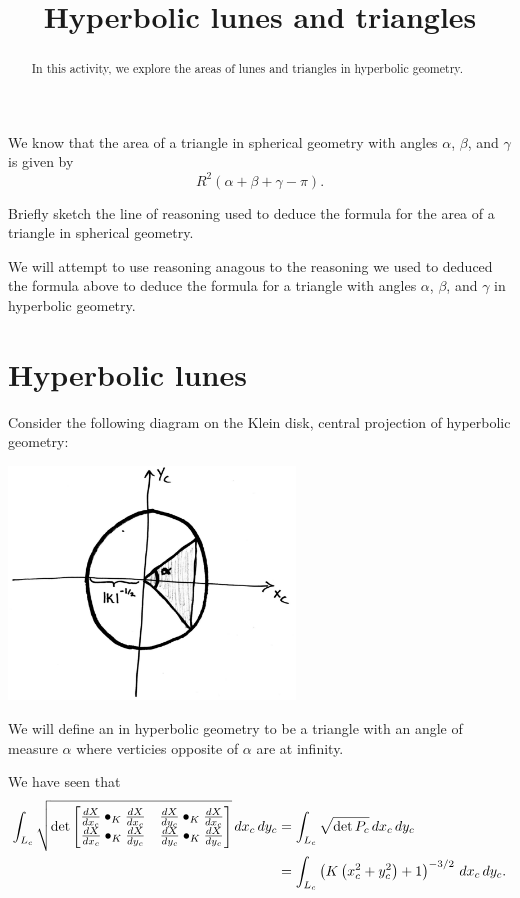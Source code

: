 \documentclass{ximera}
\title{Hyperbolic lunes and triangles}
\begin{document}
\begin{abstract}
In this activity, we explore the areas of lunes and triangles in
hyperbolic geometry.
\end{abstract}
\maketitle

We know that the area of a triangle in spherical geometry with angles
$\alpha$, $\beta$, and $\gamma$ is given by
\[
R^2(\alpha+\beta+\gamma - \pi).
\]
\begin{problem}
  Briefly sketch the line of reasoning used to deduce the formula for
  the area of a triangle in spherical geometry.
\end{problem}

We will attempt to use reasoning anagous to the reasoning we used to
deduced the formula above to deduce the formula for a triangle with
angles $\alpha$, $\beta$, and $\gamma$ in hyperbolic geometry.

\section{Hyperbolic lunes}

Consider the following diagram on the Klein disk, central projection
of hyperbolic geometry:
\begin{image}
  \includegraphics[width=3in]{diagramOfHyperbolicLune.png}
\end{image}

\begin{definition}
  We will define an  in hyperbolic
  geometry to be a triangle with an angle of measure $\alpha$ where
  verticies opposite of $\alpha$ are at infinity.
\end{definition}

We have seen that
\begin{align*}
  \int_{L_c} \sqrt{
  \det
  \begin{bmatrix}
    \dd[X]{x_c}\bullet_K \dd[X]{x_c} & \dd[X]{y_c}\bullet_K \dd[X]{x_c} \\
    \dd[X]{x_c}\bullet_K \dd[X]{y_c} & \dd[X]{y_c}\bullet_K \dd[X]{y_c}
  \end{bmatrix}
  }\d x_c\d y_c &=
  \int_{L_c} \sqrt{\det P_c}\d x_c\d y_c\\
  &=\int_{L_c} \left(K\left(x_c^2+y_c^2\right)+1\right)^{-3/2} \d x_c\d y_c.
\end{align*}
\end{document}
